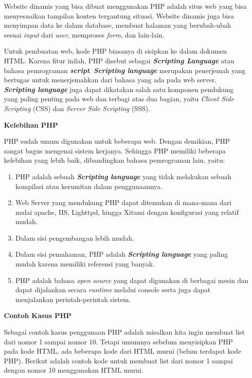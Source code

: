 \documentclass[a4paper,twoside]{article}
\begin{document}
\begin{enumerate}
	Website dinamis yang bisa dibuat menggunakan PHP adalah situs web yang bisa menyesuaikan tampilan konten tergantung situasi. Website dinamis juga bisa menyimpan data ke dalam database, membuat halaman yang berubah-ubah sesuai \textit{input} dari \textit{user}, memproses \textit{form}, dan lain-lain.
	
	Untuk pembuatan web, kode PHP biasanya di sisipkan ke dalam dokumen HTML. Karena fitur inilah, PHP disebut sebagai \textit{\textbf{Scripting Language}} atau bahasa pemrograman \textbf{\textit{script}}. \textit{\textbf{Scripting language}} merupakan penerjemah yang bertugas untuk menerjemahkan dari bahasa yang ada pada web server. \textit{\textbf{Scripting language}} juga dapat dikatakan salah satu komponen pendukung yang paling penting pada web dan terbagi atas dua bagian, yaitu \textit{Client Side Scripting} (CSS) dan \textit{Server Side Scripting} (SSS).

\textbf{Kelebihan PHP}


PHP sudah umum digunakan untuk beberapa web. Dengan demikian, PHP sangat bagus mengenai sistem kerjanya. Sehingga PHP memiliki beberapa kelebihan yang lebih baik, dibandingkan bahasa pemrograman lain, yaitu:
\begin{enumerate}
	\item PHP adalah sebuah \textit{\textbf{Scripting language}} yang tidak melakukan sebuah kompilasi atau kerumitan dalam penggunaannya.
	\item Web Server yang mendukung PHP dapat ditemukan di mana-mana dari mulai apache, IIS, Lighttpd, hingga Xitami dengan konfigurasi yang relatif mudah.
	\item Dalam sisi pengembangan lebih mudah.
	\item Dalam sisi pemahaman, PHP adalah \textit{\textbf{Scripting language}} yang paling mudah karena memiliki referensi yang banyak.
	\item PHP adalah bahasa \textit{open source} yang dapat digunakan di berbagai mesin dan dapat dijalankan secara \textit{runtime} melalui console serta juga dapat menjalankan perintah-perintah sistem.
\end{enumerate}

\textbf{Contoh Kasus PHP}	

	Sebagai contoh kasus penggunaan PHP adalah misalkan kita ingin membuat list dari nomor 1 sampai nomor 10. Tetapi umumnya sebelum menyisipkan PHP pada kode HTML, ada beberapa kode dari HTML murni (belum terdapat kode PHP). Berikut adalah contoh kode untuk membuat list dari nomor 1 sampai dengan nomor 10 menggunakan HTML murni.
	

\end{enumerate}
\end{document}
